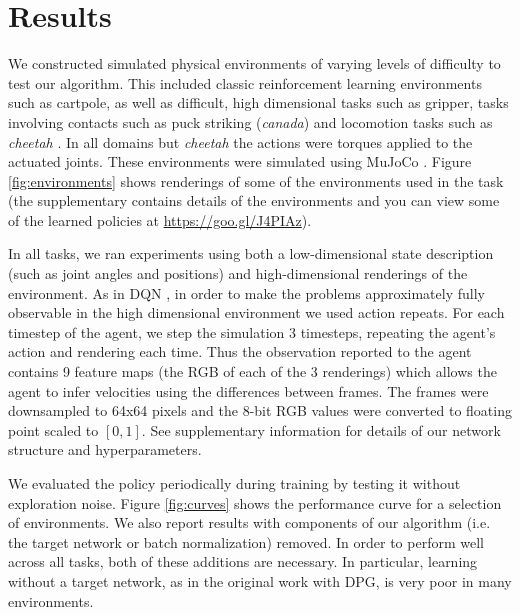 \documentclass{article} %
\begin{document}
\section{Results}

We constructed simulated physical environments of varying levels of
difficulty to test our algorithm. This included classic reinforcement
learning environments such as cartpole, as well as difficult, high
dimensional tasks such as gripper, tasks involving contacts such as
puck striking (\emph{canada}) and locomotion tasks such as
\emph{cheetah} \citep{wawrzynski2009real}.  In all domains but
\emph{cheetah} the actions were torques applied to the actuated joints.
These environments were simulated using
MuJoCo \citep{todorov2012mujoco}.
Figure \ref{fig:environments} shows renderings of
some of the environments used in the task (the supplementary contains
details of the environments and you can view some of the learned policies at
\url{https://goo.gl/J4PIAz}).


In all tasks, we ran experiments using both a low-dimensional state
description (such as joint angles and positions) and high-dimensional
renderings of the environment. As in DQN \citep{mnih2013playing,
  mnih2015human}, in order to make the problems approximately fully
observable in the high dimensional environment we used action
repeats. For each timestep of the agent, we step the simulation 3
timesteps, repeating the agent's action and rendering each time.  Thus
the observation reported to the agent contains 9 feature maps (the RGB
of each of the 3 renderings) which allows the agent to infer
velocities using the differences between frames. The frames were
downsampled to 64x64 pixels and the 8-bit RGB values were converted to
floating point scaled to $[0, 1]$. See supplementary information for
details of our network structure and hyperparameters.

We evaluated the policy periodically during training by testing it without
exploration noise. Figure
\ref{fig:curves} shows the performance curve for a selection of environments.
We also report results with components of our algorithm (i.e. the target
network or batch normalization) removed. In order to perform well across
all tasks, both of these additions are necessary. In particular, learning
without a target network, as in the original work with DPG,
is very poor in many environments.
\end{document}
